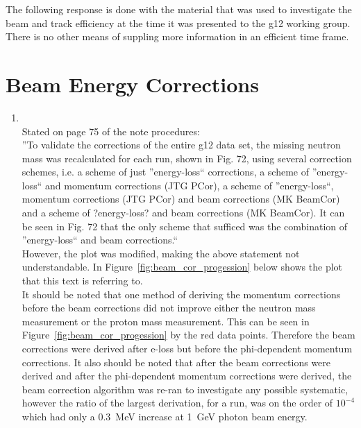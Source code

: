 \documentclass[10pt,a4paper]{article}
\begin{document}
	The following response is done with the material that was used to investigate the beam and track efficiency at the time it was presented to the g12 working group. There is no other means of suppling more information in an efficient time frame.
	\section{Beam Energy Corrections}
\begin{enumerate}
	\item
	\\
	Stated on page 75 of the note procedures:\\
	''To validate the corrections of the entire g12 data set, the missing neutron mass was recalculated for each run, shown in Fig. 72, using several correction schemes, i.e. a scheme of just ''energy-loss`` corrections, a scheme of ''energy-loss`` and momentum corrections (JTG PCor), a scheme of ''energy-loss``, momentum corrections (JTG PCor) and beam corrections (MK BeamCor) and a scheme of ?energy-loss? and beam corrections (MK BeamCor). It can be seen in Fig. 72 that the only scheme that sufficed was the combination of ''energy-loss`` and beam corrections.``\\ However, the plot was modified, making the above statement not understandable. In Figure~\ref{fig:beam_cor_progession} below shows the plot that this text is referring to. \\
	It should be noted that one method of deriving the momentum corrections before the beam corrections did not improve either the neutron mass measurement or the proton mass measurement. This can be seen in Figure~\ref{fig:beam_cor_progession} by the red data points. Therefore the beam corrections were derived after e-loss but before the phi-dependent momentum corrections. It also should be noted that after the beam corrections were derived and after the phi-dependent momentum corrections were derived, the beam correction algorithm was re-ran to investigate any possible systematic, however the ratio of the largest derivation, for a run, was on the order of $10^{-4}$ which had only a 0.3~MeV increase at 1~GeV photon beam energy.
	\begin{figure}[h!]\begin{center}

\end{center}
\end{figure}
\end{enumerate}
\end{document}
